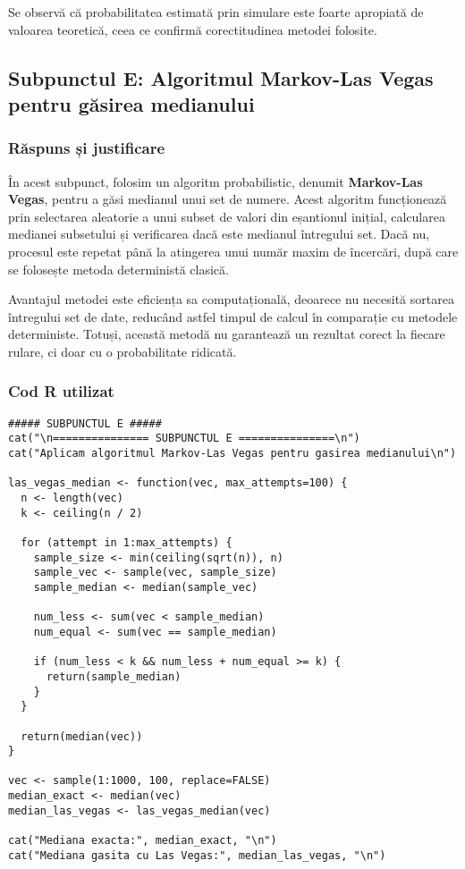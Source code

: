 \documentclass{article}
\begin{document}
Se observă că probabilitatea estimată prin simulare este foarte apropiată de valoarea teoretică, ceea ce confirmă corectitudinea metodei folosite.

\newpage

\subsection{Subpunctul E: Algoritmul Markov-Las Vegas pentru găsirea medianului}

\subsubsection*{Răspuns și justificare}

În acest subpunct, folosim un algoritm probabilistic, denumit \textbf{Markov-Las Vegas}, pentru a găsi medianul unui set de numere. Acest algoritm funcționează prin selectarea aleatorie a unui subset de valori din eșantionul inițial, calcularea medianei subsetului și verificarea dacă este medianul întregului set. Dacă nu, procesul este repetat până la atingerea unui număr maxim de încercări, după care se folosește metoda deterministă clasică.

Avantajul metodei este eficiența sa computațională, deoarece nu necesită sortarea întregului set de date, reducând astfel timpul de calcul în comparație cu metodele deterministe. Totuși, această metodă nu garantează un rezultat corect la fiecare rulare, ci doar cu o probabilitate ridicată.

\subsubsection*{Cod R utilizat}

\begin{lstlisting}
##### SUBPUNCTUL E #####
cat("\n=============== SUBPUNCTUL E ===============\n")
cat("Aplicam algoritmul Markov-Las Vegas pentru gasirea medianului\n")

las_vegas_median <- function(vec, max_attempts=100) {
  n <- length(vec)
  k <- ceiling(n / 2)  
  
  for (attempt in 1:max_attempts) {
    sample_size <- min(ceiling(sqrt(n)), n)  
    sample_vec <- sample(vec, sample_size)  
    sample_median <- median(sample_vec)
    
    num_less <- sum(vec < sample_median)
    num_equal <- sum(vec == sample_median)
    
    if (num_less < k && num_less + num_equal >= k) {
      return(sample_median)
    }
  }
  
  return(median(vec))
}

vec <- sample(1:1000, 100, replace=FALSE)  
median_exact <- median(vec)
median_las_vegas <- las_vegas_median(vec)

cat("Mediana exacta:", median_exact, "\n")
cat("Mediana gasita cu Las Vegas:", median_las_vegas, "\n")
\end{lstlisting}
\end{document}
